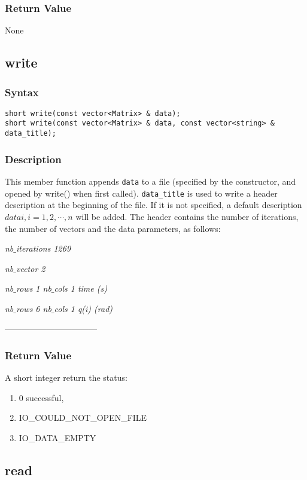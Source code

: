 \documentclass[11pt,fleqn,letterpaper]{report}
\begin{document}
\subsubsection*{Return Value}

None

\newpage

\subsection*{write}
\subsubsection*{Syntax}
\begin{verbatim}
short write(const vector<Matrix> & data);
short write(const vector<Matrix> & data, const vector<string> & data_title);
\end{verbatim}

\subsubsection*{Description}   
This member function appends \texttt{data} to a file (specified by the
constructor, and opened by write() when first called). 
\texttt{data\_title} is used to write a header description at the
beginning of the file. If it is not specified, a default 
description $datai, i=1,2,\cdots,n$ will be added. The header
contains the number of iterations,
the number of vectors and the data parameters, as follows:

\indent
\emph{nb$\_$iterations 1269}
 
\emph{nb$\_$vector 2} 

\emph{nb$\_$rows 1  nb$\_$cols 1  time (s)}

\emph{nb$\_$rows 6  nb$\_$cols 1  q(i) (rad)}

---------------------------------

\subsubsection*{Return Value}
A short integer return the status:
\begin{enumerate}
\item[] 0 successful, 
\item[] IO\_COULD\_NOT\_OPEN\_FILE
\item[] IO\_DATA\_EMPTY
\end{enumerate}
\newpage 

\subsection*{read}
\end{document}
